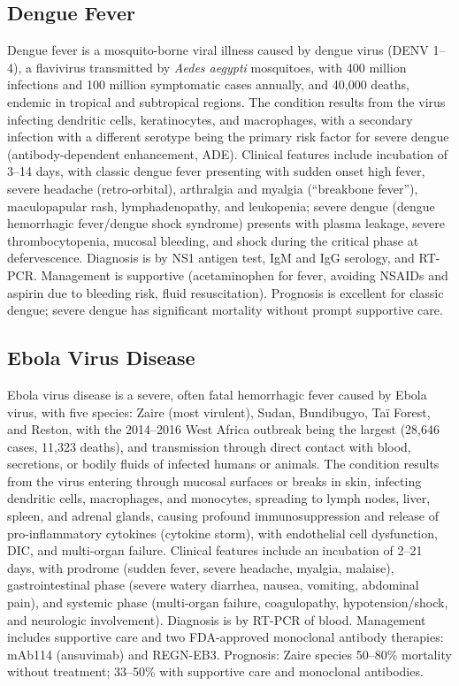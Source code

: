 \subsection{Dengue Fever}
\label{sec:Dengue Fever}
Dengue fever is a mosquito-borne viral illness caused by dengue virus (DENV 1--4), a flavivirus transmitted by \textit{Aedes aegypti} mosquitoes, with 400 million infections and 100 million symptomatic cases annually, and 40,000 deaths, endemic in tropical and subtropical regions. The condition results from the virus infecting dendritic cells, keratinocytes, and macrophages, with a secondary infection with a different serotype being the primary risk factor for severe dengue (antibody-dependent enhancement, ADE). Clinical features include incubation of 3--14 days, with classic dengue fever presenting with sudden onset high fever, severe headache (retro-orbital), arthralgia and myalgia (``breakbone fever''), maculopapular rash, lymphadenopathy, and leukopenia; severe dengue (dengue hemorrhagic fever/dengue shock syndrome) presents with plasma leakage, severe thrombocytopenia, mucosal bleeding, and shock during the critical phase at defervescence. Diagnosis is by NS1 antigen test, IgM and IgG serology, and RT-PCR. Management is supportive (acetaminophen for fever, avoiding NSAIDs and aspirin due to bleeding risk, fluid resuscitation). Prognosis is excellent for classic dengue; severe dengue has significant mortality without prompt supportive care.

\subsection{Ebola Virus Disease}
\label{sec:Ebola Virus Disease}
Ebola virus disease is a severe, often fatal hemorrhagic fever caused by Ebola virus, with five species: Zaire (most virulent), Sudan, Bundibugyo, Taï Forest, and Reston, with the 2014--2016 West Africa outbreak being the largest (28,646 cases, 11,323 deaths), and transmission through direct contact with blood, secretions, or bodily fluids of infected humans or animals. The condition results from the virus entering through mucosal surfaces or breaks in skin, infecting dendritic cells, macrophages, and monocytes, spreading to lymph nodes, liver, spleen, and adrenal glands, causing profound immunosuppression and release of pro-inflammatory cytokines (cytokine storm), with endothelial cell dysfunction, DIC, and multi-organ failure. Clinical features include an incubation of 2--21 days, with prodrome (sudden fever, severe headache, myalgia, malaise), gastrointestinal phase (severe watery diarrhea, nausea, vomiting, abdominal pain), and systemic phase (multi-organ failure, coagulopathy, hypotension/shock, and neurologic involvement). Diagnosis is by RT-PCR of blood. Management includes supportive care and two FDA-approved monoclonal antibody therapies: mAb114 (ansuvimab) and REGN-EB3. Prognosis: Zaire species 50--80\% mortality without treatment; 33--50\% with supportive care and monoclonal antibodies.

